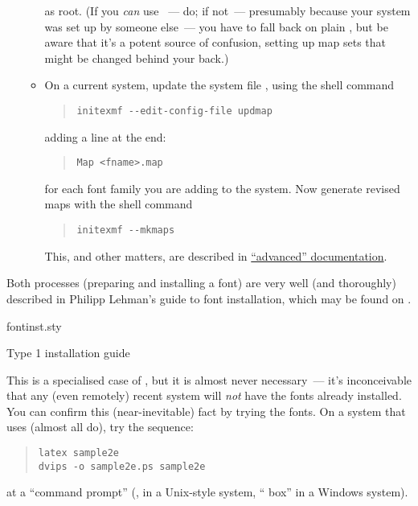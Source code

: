 \begin{itemize}
\begin{itemize}
    as root.  (If you \emph{can} use ~--- do; if
    not~--- presumably because your \alltex{} system was set up by
    someone else~--- you have to fall back on plain ,
    but be aware that it's a potent source of confusion, setting up
    map sets that might be changed behind your back.)
  \item On a current \miktex{} system, update the system file
    , using the shell command
\begin{quote}
\begin{verbatim}
initexmf --edit-config-file updmap
\end{verbatim}
\end{quote}
    adding a line at the end:
\begin{quote}
\begin{verbatim}
Map <fname>.map
\end{verbatim}
\end{quote}
    for each font family  you are adding to the system.
    Now generate revised maps with the shell command
\begin{quote}
\begin{verbatim}
initexmf --mkmaps
\end{verbatim}
\end{quote}
    This, and other matters, are described in \miktex{} %
    \href{http://docs.miktex.org/manual/advanced.html}{``advanced'' documentation}.
  \end{itemize}
\end{itemize}
Both processes (preparing and installing a font) are very well (and
thoroughly) described in Philipp Lehman's guide to font installation,
which may be found on .
\begin{ctanrefs}
\item[fontinst.sty]
\item[\nothtml{\rmfamily}Type 1 installation guide]
\end{ctanrefs}


This is a specialised case of ,
but it is almost never necessary~--- it's inconceivable that any (even
remotely) recent system will \emph{not} have the fonts already
installed.  You can confirm this (near-inevitable) fact by trying the
fonts.  On a system that uses  (almost all do), try
the sequence:
\begin{quote}
\begin{verbatim}
latex sample2e
dvips -o sample2e.ps sample2e
\end{verbatim}
\end{quote}
at a ``command prompt'' (, in a Unix-style system,
`` box'' in a Windows system).

